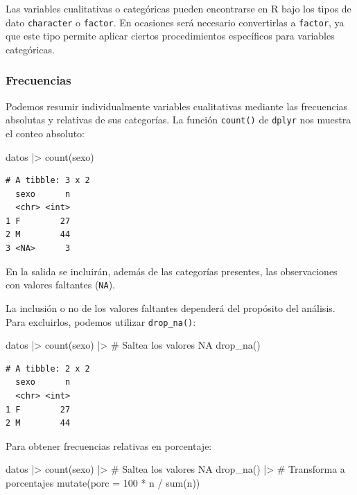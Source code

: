 \documentclass[
  spanish,
  letterpaper,
  DIV=11,
  numbers=noendperiod]{scrreprt}
\newenvironment{Shaded}{\begin{snugshade}}{\end{snugshade}}
\newcommand{\AttributeTok}[1]{\textcolor[rgb]{0.40,0.45,0.13}{#1}}
\newcommand{\CommentTok}[1]{\textcolor[rgb]{0.37,0.37,0.37}{#1}}
\newcommand{\DecValTok}[1]{\textcolor[rgb]{0.68,0.00,0.00}{#1}}
\newcommand{\FunctionTok}[1]{\textcolor[rgb]{0.28,0.35,0.67}{#1}}
\newcommand{\NormalTok}[1]{\textcolor[rgb]{0.00,0.23,0.31}{#1}}
\newcommand{\SpecialCharTok}[1]{\textcolor[rgb]{0.37,0.37,0.37}{#1}}
\begin{document}
Las variables cualitativas o categóricas pueden encontrarse en R bajo
los tipos de dato \texttt{character} o \texttt{factor}. En ocasiones
será necesario convertirlas a \texttt{factor}, ya que este tipo permite
aplicar ciertos procedimientos específicos para variables categóricas.

\subsubsection{Frecuencias}\label{frecuencias}

Podemos resumir individualmente variables cualitativas mediante las
frecuencias absolutas y relativas de sus categorías. La función
\texttt{count()} de \texttt{dplyr} nos muestra el conteo absoluto:

\begin{Shaded}
\begin{Highlighting}[]
\NormalTok{datos }\SpecialCharTok{|\textgreater{}}
  \FunctionTok{count}\NormalTok{(sexo)}
\end{Highlighting}
\end{Shaded}

\begin{verbatim}
# A tibble: 3 x 2
  sexo      n
  <chr> <int>
1 F        27
2 M        44
3 <NA>      3
\end{verbatim}

En la salida se incluirán, además de las categorías presentes, las
observaciones con valores faltantes (\texttt{NA}).

La inclusión o no de los valores faltantes dependerá del propósito del
análisis. Para excluirlos, podemos utilizar \texttt{drop\_na()}:

\begin{Shaded}
\begin{Highlighting}[]
\NormalTok{datos }\SpecialCharTok{|\textgreater{}}
  \FunctionTok{count}\NormalTok{(sexo) }\SpecialCharTok{|\textgreater{}}
  \CommentTok{\# Saltea los valores NA}
  \FunctionTok{drop\_na}\NormalTok{()}
\end{Highlighting}
\end{Shaded}

\begin{verbatim}
# A tibble: 2 x 2
  sexo      n
  <chr> <int>
1 F        27
2 M        44
\end{verbatim}

Para obtener frecuencias relativas en porcentaje:

\begin{Shaded}
\begin{Highlighting}[]
\NormalTok{datos }\SpecialCharTok{|\textgreater{}}
  \FunctionTok{count}\NormalTok{(sexo) }\SpecialCharTok{|\textgreater{}}
  \CommentTok{\# Saltea los valores NA}
  \FunctionTok{drop\_na}\NormalTok{() }\SpecialCharTok{|\textgreater{}}
  \CommentTok{\# Transforma a porcentajes}
  \FunctionTok{mutate}\NormalTok{(}\AttributeTok{porc =} \DecValTok{100} \SpecialCharTok{*}\NormalTok{ n }\SpecialCharTok{/} \FunctionTok{sum}\NormalTok{(n))}
\end{Highlighting}
\end{Shaded}
\end{document}
